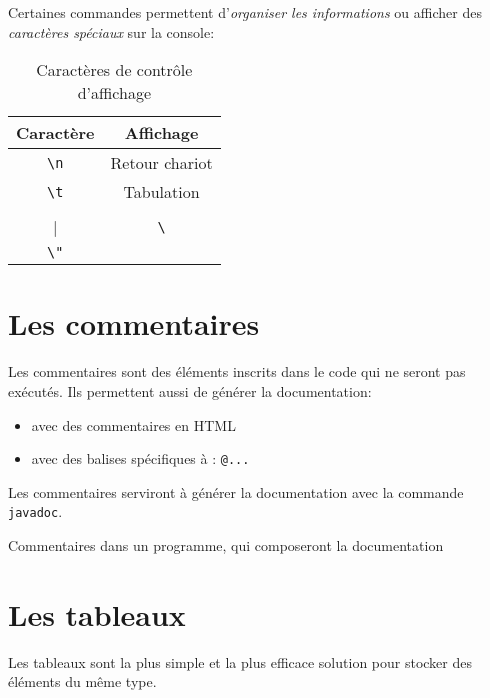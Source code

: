 			Certaines commandes permettent d'\emph{organiser les informations} ou afficher des \emph{caractères spéciaux} sur la console:
			\begin{table}[h]
				\centering
				\begin{tabular}{|c|c|}
					\hline 
					Caractère & Affichage \\ 
					\hline 
					\lstinline|\n| & Retour chariot \\ 
					\hline 
					\lstinline|\t| & Tabulation \\ 
					\hline 
					\lstinline|\\| & \lstinline|\| \\ 
					\hline 
					\lstinline|\"| & \og  \\ 
					\hline 
				\end{tabular}
			\caption{Caractères de contrôle d'affichage}
			\label{tableaucaracteresaffichage} 
			\end{table}	
			
		\section{Les commentaires}
		
			\begin{definition}
				Les commentaires sont des éléments inscrits dans le code qui ne seront pas exécutés.
				Ils permettent aussi de générer la documentation:
					\begin{itemize}
						\item avec des commentaires en HTML
						\item avec des balises spécifiques à \lang{}: \lstinline|@...|
					\end{itemize}
			\end{definition}
		
			Les commentaires serviront à générer la documentation avec la commande \lstinline|javadoc|.
			
			\begin{exemple}
				Commentaires dans un programme, qui composeront la documentation
				
			\end{exemple}
			
		\section{Les tableaux}
		
			Les tableaux sont la plus simple et la plus efficace solution pour stocker des éléments du même type.
			
